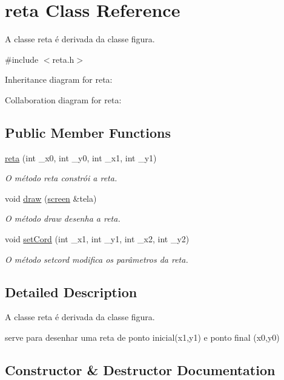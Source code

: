\hypertarget{classreta}{}\section{reta Class Reference}
\label{classreta}


A classe reta é derivada da classe figura.  




{\ttfamily \#include $<$reta.\+h$>$}



Inheritance diagram for reta\+:


Collaboration diagram for reta\+:
\subsection*{Public Member Functions}
\begin{DoxyCompactItemize}
\item 
\hyperlink{classreta_aab94a3852ec058f87746bc08631ddc0f}{reta} (int \+\_\+x0, int \+\_\+y0, int \+\_\+x1, int \+\_\+y1)
\begin{DoxyCompactList}\small\item\em O método reta constrói a reta. \end{DoxyCompactList}\item 
void \hyperlink{classreta_a343b02ffe90a9b860cd43bb449b836e0}{draw} (\hyperlink{classscreen}{screen} \&tela)
\begin{DoxyCompactList}\small\item\em O método draw desenha a reta. \end{DoxyCompactList}\item 
void \hyperlink{classreta_a810e2a112e932caa6a410a10250034a0}{set\+Cord} (int \+\_\+x1, int \+\_\+y1, int \+\_\+x2, int \+\_\+y2)
\begin{DoxyCompactList}\small\item\em O método setcord modifica os parâmetros da reta. \end{DoxyCompactList}\end{DoxyCompactItemize}


\subsection{Detailed Description}
A classe reta é derivada da classe figura. 

serve para desenhar uma reta de ponto inicial(x1,y1) e ponto final (x0,y0) 

\subsection{Constructor \& Destructor Documentation}
